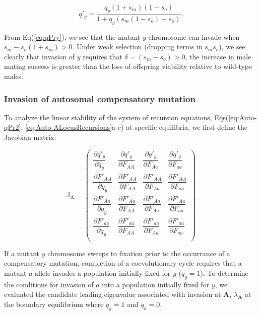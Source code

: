 \documentclass{article}
\begin{document}
\begin{equation} \label{eq:qPry}
	q'_{y} = \frac{q_y (1 + s_m)(1 - s_o)}{1 + q_y (s_m (1 - s_o) - s_o)}.
\end{equation}

\noindent From Eq(\ref{eq:qPry}), we see that the mutant $y$ chromosome can invade when $s_m - s_o(1 + s_m) > 0$. Under weak selection (dropping terms in $s_m s_o$), we see clearly that invasion of $y$ requires that $\delta = (s_m - s_o) > 0$, the increase in male mating success is greater than the loss of offspring viability relative to wild-type males.


\subsubsection{Invasion of autosomal compensatory mutation}

To analyze the linear stability of the system of recursion equations, Eqs(\ref{eq:Auto-qPr2}, \ref{eq:Auto-ALocusRecursions}a-c) at specific equilibria, we first define the Jacobian matrix:

\begin{equation}
	\mathbb{J}_{\text{A}} = \left( \begin{array}{cccc} 
		\dfrac{\partial  q'_y}{\partial q_y} & \dfrac{\partial  q'_y}{\partial F_{AA}} & \dfrac{\partial  q'_y}{\partial F_{Aa}} & \dfrac{\partial  q'_y}{\partial F_{aa}} \\ 
		\dfrac{\partial  F'_{AA}}{\partial q_y} & \dfrac{\partial  F'_{AA}}{\partial F_{AA}} & \dfrac{\partial  F'_{AA}}{\partial F_{Aa}} & \dfrac{\partial  F'_{AA}}{\partial F_{aa}} \\ 
		\dfrac{\partial  F'_{Aa}}{\partial q_y} & \dfrac{\partial  F'_{Aa}}{\partial F_{AA}} & \dfrac{\partial  F'_{Aa}}{\partial F_{Aa}} & \dfrac{\partial  F'_{Aa}}{\partial F_{aa}} \\ 
		\dfrac{\partial  F'_{aa}}{\partial q_y} & \dfrac{\partial  F'_{aa}}{\partial F_{AA}} & \dfrac{\partial  F'_{aa}}{\partial F_{Aa}} & \dfrac{\partial  F'_{aa}}{\partial F_{aa}} \\ 
	\end{array} \right)
\end{equation}

\noindent If a mutant $y$ chromosome sweeps to fixation prior to the occurrance of a compensatory mutation, completion of a coevolutionary cycle requires that a mutant $a$ allele invades a population initially fixed for $y$ ($q_y = 1$). To determine the conditions for invasion of $a$ into a population initially fixed for $y$, we evaluated the candidate leading eigenvalue associated with invasion at $\mathbf{A}$, $\lambda_{\mathbf{A}}$ at the boundary equilibrium where $q_y = 1$ and $q_a = 0$.
\end{document}
